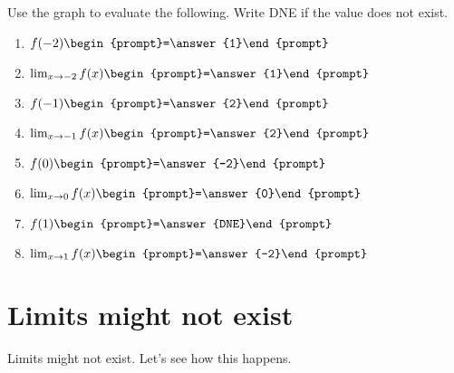 \documentclass{ximera}
\begin{document}
\begin{question}
\begin{image}
\end{image}
  Use the graph to evaluate the following. Write DNE if the value does
  not exist.
  \begin{enumerate}
    \item $f(-2) \begin{prompt}=\answer{1}\end{prompt}$
    \item $\lim_{x\to -2}f(x)\begin{prompt}=\answer{1}\end{prompt}$
    \item $f(-1) \begin{prompt}=\answer{2}\end{prompt}$
    \item $\lim_{x\to -1}f(x) \begin{prompt}=\answer{2}\end{prompt}$
    \item $f(0) \begin{prompt}=\answer{-2}\end{prompt}$
    \item $\lim_{x\to 0} f(x) \begin{prompt}=\answer{0}\end{prompt}$
    \item $f(1) \begin{prompt}=\answer{DNE}\end{prompt}$
    \item $\lim_{x\to 1} f(x) \begin{prompt}=\answer{-2}\end{prompt}$
  \end{enumerate}
\end{question}





\section{Limits might not exist}

Limits might not exist. Let's see how this happens.
\end{document}

